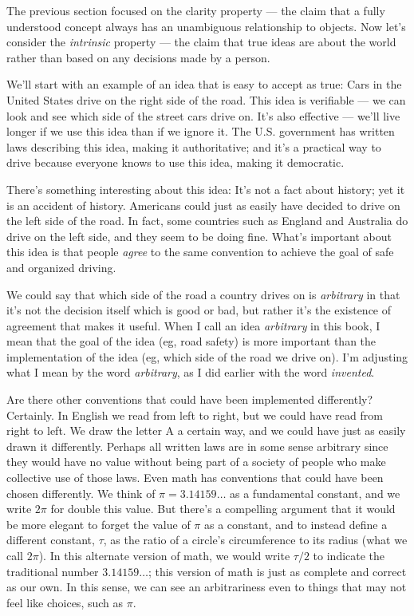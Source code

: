 \documentclass[9pt, twoside]{book}
\theoremstyle{argtstyle}
\begin{document}
The previous section focused on the clarity property --- the claim that a fully
understood
concept always has an unambiguous relationship to objects.
Now let's
consider the {\em intrinsic} property --- the claim that true ideas are about
the world
rather
than based on any decisions made by a person.


We'll start with an example of an
idea that is easy to accept as true:
Cars in the United States drive on the right side of the road.
This idea is verifiable --- we can look and see which side of the street cars
drive on.
It's also effective --- we'll live
longer if we use this idea than if we ignore it.
The U.S.
government has written laws describing this idea, making it authoritative;
and it's a practical
way to drive
because everyone knows to use this idea, making it democratic.

There's something interesting about this idea:
It's not a fact about history; yet it is an accident of history.
Americans could just as
easily have decided to drive on the left side of the road. In fact,
some countries such as England and Australia do drive on the left side, and they
seem to be doing fine. What's important about this idea is that people
{\em agree} to the same convention to achieve the goal of
safe and organized driving.

We could say that which side of the road a country drives on is {\em arbitrary}
in that it's not the decision itself which is good or bad, but rather it's the
existence of agreement that makes it useful.
When I call an idea {\em arbitrary}
in this book, I mean that the goal of the idea (eg, road safety) is more
important than the implementation of the idea (eg, which side of the road we
drive on).
I'm adjusting what I mean by the word {\em arbitrary}, as I did earlier with the
word {\em invented}.

Are there other conventions that could have been implemented differently?
Certainly. In English we read from left to right, but we could have
read from right to left. We draw the letter A a certain way, and we could have
just as easily drawn it differently. Perhaps all written laws are in some sense
arbitrary since they would have no value without being part of a society of
people who make collective use of those laws.
Even math has conventions that could have been chosen differently.
We
think of $\pi=3.14159\ldots$ as a fundamental constant, and we write $2\pi$ for
double this value.
But there's a compelling argument that it would be more elegant to forget the
value of $\pi$ as a constant, and to instead define a different constant,
$\tau$, as the ratio of a circle's circumference to its radius (what we call
$2\pi$). In this alternate version of math, we would write $\tau/2$ to indicate
the traditional number $3.14159\ldots$; this version of math is just as
complete and correct as our own. In this sense, we can see an arbitrariness even
to things that may not feel like choices, such as $\pi$.
\end{document}
